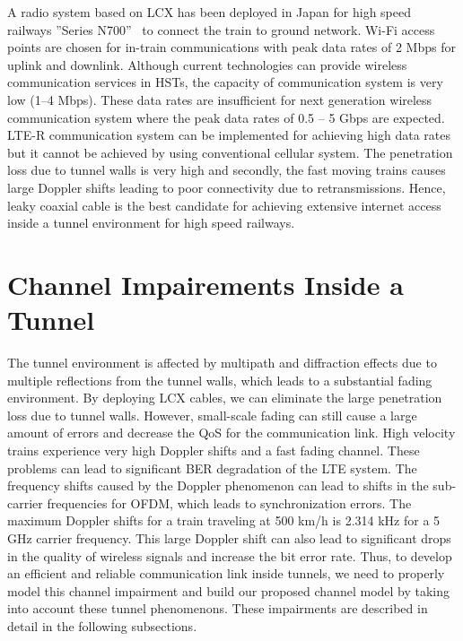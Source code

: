 A radio system based on LCX has been deployed in Japan for high speed railways ''Series N700''~\cite{takatsu2007history} to connect the train to ground network. Wi-Fi access points are chosen for in-train communications with peak data rates of 2 Mbps for uplink and downlink. Although current technologies can provide wireless communication services in HSTs, the capacity of communication system is very low (1--4 Mbps). These data rates are insufficient for next generation wireless communication system where the peak data rates of 0.5 -- 5 Gbps are expected. LTE-R communication system can be implemented for achieving high data rates but it cannot be achieved by using conventional cellular system. The penetration loss due to tunnel walls is very high and secondly, the fast moving trains causes large Doppler shifts leading to poor connectivity due to retransmissions. Hence, leaky coaxial cable is the best candidate for achieving extensive internet access inside a tunnel environment for high speed railways.

\section{Channel Impairements Inside a Tunnel}
The tunnel environment is affected by multipath and diffraction effects due to multiple reflections from the tunnel walls, which leads to a substantial fading environment. By deploying LCX cables, we can eliminate the large penetration loss due to tunnel walls. However, small-scale fading can still cause a large amount of errors and decrease the QoS for the communication link. High velocity trains experience very high Doppler shifts and a fast fading channel. These problems can lead to significant BER degradation of the LTE system. The frequency shifts caused by the Doppler phenomenon can lead to shifts in the sub-carrier frequencies for OFDM, which leads to synchronization errors. The maximum Doppler shifts for a train traveling at 500 km/h is 2.314 kHz for a 5 GHz carrier frequency. This large Doppler shift can also lead to significant drops in the quality of wireless signals and increase the bit error rate. Thus,
to develop an efficient and reliable communication link inside tunnels, we need to properly model this channel impairment and build our proposed channel model by taking into account these tunnel phenomenons. These impairments are described in detail in the following subsections.

